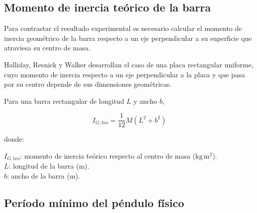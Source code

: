 \documentclass[11pt,a4paper]{article}
\newenvironment{subsectionbody}
{%
    \begin{list}{}{%
        \setlength{\leftmargin}{0.6cm}%
        \setlength{\rightmargin}{0cm}%
        \setlength{\topsep}{0pt}%
        \setlength{\partopsep}{0pt}%
        \setlength{\parsep}{0pt}%
        \setlength{\itemsep}{0pt}%
    }%
    \item\relax
}
{%
    \end{list}
}
\begin{document}
\subsection{Momento de inercia teórico de la barra}
\begin{subsectionbody}

Para contrastar el resultado experimental es necesario calcular el
momento de inercia geométrico de la barra respecto a un eje
perpendicular a su superficie que atraviesa su centro de masa.

Halliday, Resnick y Walker desarrollan el caso de una placa rectangular
uniforme, cuyo momento de inercia respecto a un eje perpendicular a la
placa y que pasa por su centro depende de sus dimensiones geométricas.

Para una barra rectangular de longitud $L$ y ancho $b$,

\begin{equation}
\boxed{
I_{G,\mathrm{teo}}
=
\frac{1}{12}M\left(L^2+b^2\right)
}
\label{eq:momento_teorico}
\end{equation}

donde:

\hspace*{0.5cm}$I_{G,\mathrm{teo}}$: momento de inercia teórico respecto
al centro de masa ($\mathrm{kg\,m^2}$).\\
\hspace*{0.5cm}$L$: longitud de la barra ($\mathrm{m}$).\\
\hspace*{0.5cm}$b$: ancho de la barra ($\mathrm{m}$).

\end{subsectionbody}

\subsection{Período mínimo del péndulo físico}
\end{document}
